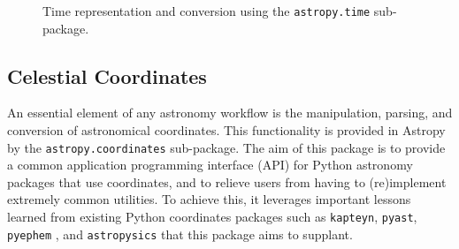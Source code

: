 \documentclass[traditabstract]{aa}
\begin{document}
\begin{figure}
\center
\caption{Time representation and conversion using the \texttt{astropy.time}
sub-package.\label{code:time}}
\vspace{0.1in}
\end{figure}

\subsection{Celestial Coordinates}

\label{sec:coordinates}


An essential element of any astronomy workflow is the manipulation, parsing,
and conversion of astronomical coordinates. This functionality is provided in
Astropy by the \texttt{astropy.coordinates} sub-package. The aim of this
package is to provide a common application programming interface (API) for
Python astronomy packages that use coordinates, and to relieve users from
having to (re)implement extremely common utilities. To achieve this, it
leverages important lessons learned from existing Python coordinates packages
such as \texttt{kapteyn}, \texttt{pyast}, \texttt{pyephem} \citep{pyephem}, and
\texttt{astropysics} \citep{astropysics} that this package aims to supplant.
\end{document}
